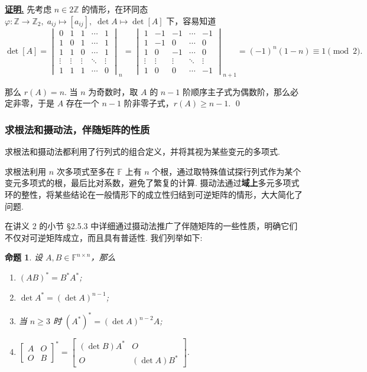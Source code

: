 \documentclass[10pt,openany]{article}
\theoremstyle{thmstyle} %
\theoremstyle{defstyle} %
\theoremstyle{prostyle} %
\newtheorem{proposition}[theorem]{命题}
\theoremstyle{exastyle}
\theoremstyle{remstyle}
\renewenvironment{proof}[1][证明]{\par\underline{\textbf{#1.}} \;\fangsong}{\qed\par}
\newcommand{\F}{\mathbb{F}}
\newcommand{\n}{^{n \times n}}
\begin{document}
\begin{proof}
	先考虑 \( n \in 2\mathbb{Z} \) 的情形，在环同态 \( \varphi:\mathbb{Z} \to \mathbb{Z}_2, \; a_{ij} \mapsto [a_{ij}], \; \det A \mapsto \det [A] \) 下，容易知道
	\[ \det [A]= \begin{vmatrix}
		0 & 1 & 1 & \cdots & 1 \\
		1 & 0 & 1 & \cdots & 1 \\
	    1 & 1 & 0 & \cdots & 1 \\
		\vdots & \vdots & \vdots & \ddots & \vdots \\
		1 & 1 & 1 & \cdots & 0
	\end{vmatrix}_n= \begin{vmatrix}
	1 & -1 & -1 & \cdots & -1 \\
	1 & -1 & 0 & \cdots & 0 \\
	1 & 0 & -1 & \cdots & 0 \\
	\vdots & \vdots & \vdots & \ddots & \vdots \\
	1 & 0 & 0 & \cdots & -1
	\end{vmatrix}_{n+1}=(-1)^n(1-n) \equiv 1 \pmod{2}. \]
	
	那么 \( r(A)=n \). 当 \( n \) 为奇数时，取 \( A \) 的 \( n-1 \) 阶顺序主子式为偶数阶，那么必定非零，于是 \( A \) 存在一个 \( n-1 \) 阶非零子式，\( r(A) \geq n-1 \).
\end{proof}

\subsubsection{求根法和摄动法，伴随矩阵的性质}

求根法和摄动法都利用了行列式的组合定义，并将其视为某些变元的多项式.

求根法利用 \( n \) 次多项式至多在 \( \F \) 上有 \( n \) 个根，通过取特殊值试探行列式作为某个变元多项式的根，最后比对系数，避免了繁复的计算. 摄动法通过\textbf{域上}多元多项式环的整性，将某些结论在一般情形下的成立性归结到可逆矩阵的情形，大大简化了问题.

在讲义 2 的小节 \S 2.5.3 中详细通过摄动法推广了伴随矩阵的一些性质，明确它们不仅对可逆矩阵成立，而且具有普适性. 我们列举如下:

\begin{proposition}
	设 \( A,B \in \F\n \)，那么
	\begin{enumerate}[(1)]
		\item \( (AB)^*=B^*A^* \);
		\item \( \det A^*= (\det A)^{n-1} \);
		\item 当 \( n \geq 3 \) 时 \( (A^*)^*=(\det A)^{n-2} A \); 
		\item \( \begin{bmatrix}
			A & O \\
			O & B
		\end{bmatrix}^*= \begin{bmatrix}
		(\det B)A^* & O \\
		O & (\det A)B^*
		\end{bmatrix} \).
	\end{enumerate}
\end{proposition}
\end{document}

